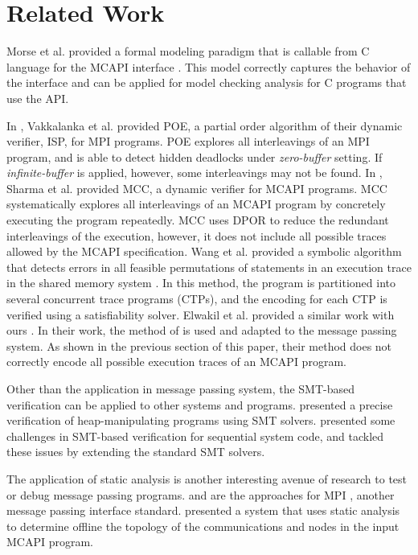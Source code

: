 \section{Related Work}
Morse et al. provided a formal modeling paradigm that is callable from C language for the MCAPI interface \cite{morse:vmcai12}. This model correctly captures the behavior of the interface and can be applied for model checking analysis for C programs that use the API.

In \cite{sarvani:fm09}, Vakkalanka et al. provided POE, a partial order algorithm of their dynamic verifier, ISP, for MPI programs. POE explores all interleavings of an MPI program, and is able to detect hidden deadlocks under \textit{zero-buffer} setting. If \textit{infinite-buffer} is applied, however, some interleavings may not be found. In \cite{sharma:fmcad09}, Sharma et al. provided MCC, a dynamic verifier for MCAPI programs. MCC systematically explores all interleavings of an MCAPI program by concretely executing the program repeatedly. MCC uses DPOR \cite{flanagan:popl05} to reduce the redundant interleavings of the execution, however, it does not include all possible traces allowed by the MCAPI specification. Wang et al. provided a symbolic algorithm that detects errors in all feasible permutations of statements in an execution trace in the shared memory system \cite{wang:fse09}. In this method, the program is partitioned into several concurrent trace programs (CTPs), and the encoding for each CTP is verified using a satisfiability solver. Elwakil et al. provided a similar work with ours \cite{elwakil:atva10,elwakil:padtad10}. In their work, the method of \cite{wang:fse09} is used and adapted to the message passing system. As shown in the previous section of this paper, their method does not correctly encode all possible execution traces of an MCAPI program.

Other than the application in message passing system, the SMT-based verification can be applied to other systems and programs. \cite{lahiri:popl08} presented a precise verification of heap-manipulating programs using SMT solvers. \cite{lahiri:cav11} presented some challenges in SMT-based verification for sequential system code, and tackled these issues by extending the standard SMT solvers.

The application of static analysis is another interesting avenue of research to test or debug message passing programs. \cite{zhang:ppopp07} and \cite{greg:cgo09} are the approaches for MPI \cite{mpi}, another message passing interface standard. \cite{gray:lctes11} presented a system that uses static analysis to determine offline the topology of the communications and nodes in the input MCAPI program.
